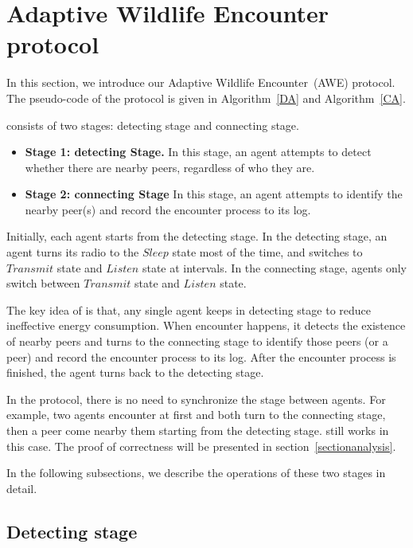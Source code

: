\section{Adaptive Wildlife Encounter protocol}
\label{sectionmodel}

In this section, we introduce our Adaptive Wildlife Encounter~(AWE) protocol.
The pseudo-code of the protocol is given in Algorithm~\ref{DA} and Algorithm~\ref{CA}.

{\pName} consists of two stages: detecting stage and 
connecting stage. 
\begin{itemize}
    \item \textbf{Stage 1: detecting Stage.} In this stage, an agent attempts to
    detect whether there are nearby peers, regardless of who they are. 
    \item \textbf{Stage 2: connecting Stage} In this stage, an agent attempts to 
    identify the nearby peer(s) and record the encounter process to its log.
\end{itemize}

Initially, each agent starts from the detecting stage. 
In the detecting stage, an agent turns its radio to the $Sleep$ state most of the time,
and switches to $Transmit$ state and $Listen$ state at intervals.
In the connecting stage, agents only switch between $Transmit$ state 
and $Listen$ state.

The key idea of {\pName} is that, any single agent keeps in detecting 
stage to reduce ineffective energy consumption. When encounter happens, 
it detects the existence of nearby peers and turns to the connecting stage 
to identify those peers (or a peer) and record the encounter process to its log. 
After the encounter process is finished, the agent turns back to the detecting stage.

\begin{remark}
    In the {\pName} protocol, there is no need to synchronize the stage between agents.
    For example, two agents encounter at first and both turn to the connecting stage,
    then a peer come nearby them starting from the detecting stage. 
    {\pName} still works in this case. The proof of correctness will be presented 
    in section~\ref{sectionanalysis}. 
\end{remark}

In the following subsections, we describe the operations of these two stages in detail. 

\subsection{Detecting stage}

